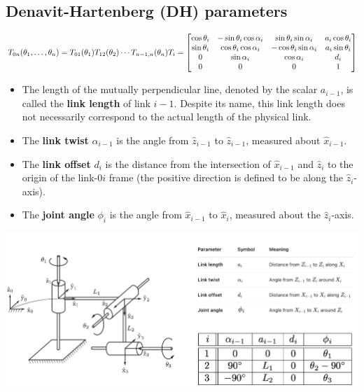 \documentclass[10pt]{article}
\begin{document}
\subsection*{Denavit-Hartenberg (DH) parameters}
\[T_{0n} (\theta_1, \dots, \theta_n) = T_{01} (\theta_1) T_{12} (\theta_2) \cdots T_{n - 1, n} (\theta_n) \hfill T_i = \begin{bmatrix} \cos \theta_i & -\sin \theta_i \cos \alpha_i & \sin \theta_i \sin \alpha_i & a_i \cos \theta_i \\ \sin \theta_i & \cos \theta_i \cos \alpha_i & -\cos \theta_i \sin \alpha_i & a_i \sin \theta_i \\ 0 & \sin \alpha_i & \cos \alpha_i & d_i \\ 0 & 0 & 0 & 1 \end{bmatrix}\]
\begin{itemize}
	\item The length of the mutually perpendicular line, denoted by the scalar $a_{i - 1}$, is called the \textbf{link length} of link $i - 1$.  Despite its name, this link length does not necessarily correspond to the actual length of the physical link.
	\item The \textbf{link twist} $\alpha_{i - 1}$ is the angle from $\hat{z}_{i - 1}$ to $\hat{z}_{i - 1}$, measured about $\hat{x}_{i - 1}$.
	\item The \textbf{link offset} $d_i$ is the distance from the intersection of $\hat{x}_{i - 1}$ and $\hat{z}_i$ to the origin of the link-0$i$ frame (the positive direction is defined to be along the $\hat{z}_i$-axis).
	\item The \textbf{joint angle} $\phi_i$ is the angle from $\hat{x}_{i - 1}$ to $\hat{x}_i$, measured about the $\hat{z}_i$-axis.
\end{itemize}
\begin{center} 
	\includegraphics*[width=\textwidth]{L1_18.png} 
\end{center}
\end{document}
